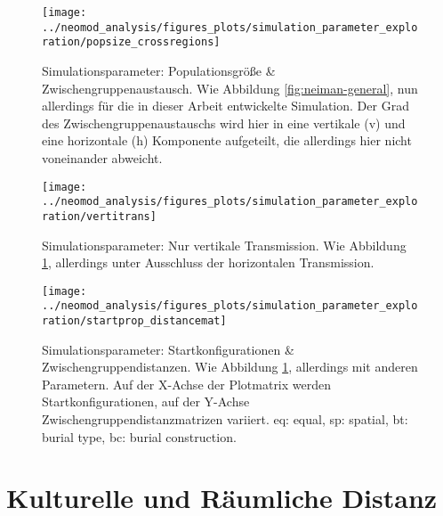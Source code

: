 \documentclass[openany,twoside,twocolumn]{book}
\begin{document}
\begin{figure}[!t]

{\centering \texttt{[image: ../neomod\_analysis/figures\_plots/simulation\_parameter\_exploration/popsize\_crossregions]} 

}

\caption[Simulationsparameter: Populationsgröße \& Zwischengruppenaustausch]{Simulationsparameter: Populationsgröße \& Zwischengruppenaustausch. Wie Abbildung \ref{fig:neiman-general}, nun allerdings für die in dieser Arbeit entwickelte Simulation. Der Grad des Zwischengruppenaustauschs wird hier in eine vertikale (v) und eine horizontale (h) Komponente aufgeteilt, die allerdings hier nicht voneinander abweicht.}\label{fig:sim-popsize-crossregions}
\end{figure}

\begin{figure}[!t]

{\centering \texttt{[image: ../neomod\_analysis/figures\_plots/simulation\_parameter\_exploration/vertitrans]} 

}

\caption[Simulationsparameter: Nur vertikale Transmission]{Simulationsparameter: Nur vertikale Transmission. Wie Abbildung \ref{fig:sim-popsize-crossregions}, allerdings unter Ausschluss der horizontalen Transmission.}\label{fig:sim-vertitrans}
\end{figure}

\begin{figure}[!t]

{\centering \texttt{[image: ../neomod\_analysis/figures\_plots/simulation\_parameter\_exploration/startprop\_distancemat]} 

}

\caption[Simulationsparameter: Startkonfigurationen \& Zwischengruppendistanzen]{Simulationsparameter: Startkonfigurationen \& Zwischengruppendistanzen. Wie Abbildung \ref{fig:sim-popsize-crossregions}, allerdings mit anderen Parametern. Auf der X-Achse der Plotmatrix werden Startkonfigurationen, auf der Y-Achse Zwischengruppendistanzmatrizen variiert. eq: equal, sp: spatial, bt: burial type, bc: burial construction.}\label{fig:sim-startprop-distancemat}
\end{figure}

\hypertarget{cultural-and-spatial-distance}{%
\section{Kulturelle und Räumliche
Distanz}\label{cultural-and-spatial-distance}}
\end{document}
